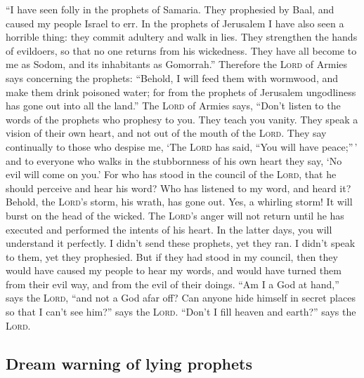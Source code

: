  ``I have seen folly in the prophets of Samaria. They
prophesied by Baal, and caused my people Israel to err. 
In the prophets of Jerusalem I have also seen a horrible thing: they
commit adultery and walk in lies. They strengthen the hands of
evildoers, so that no one returns from his wickedness. They have all
become to me as Sodom, and its inhabitants as Gomorrah.''
 Therefore the \textsc{Lord} of Armies says concerning
the prophets: ``Behold, I will feed them with wormwood, and make them
drink poisoned water; for from the prophets of Jerusalem ungodliness has
gone out into all the land.''  The \textsc{Lord} of
Armies says, ``Don't listen to the words of the prophets who prophesy to
you. They teach you vanity. They speak a vision of their own heart, and
not out of the mouth of the \textsc{Lord}.  They say
continually to those who despise me, `The \textsc{Lord} has said, ``You
will have peace;''\,' and to everyone who walks in the stubbornness of
his own heart they say, `No evil will come on you.'  For
who has stood in the council of the \textsc{Lord}, that he should
perceive and hear his word? Who has listened to my word, and heard it?
 Behold, the \textsc{Lord}'s storm, his wrath, has gone
out. Yes, a whirling storm! It will burst on the head of the wicked.
 The \textsc{Lord}'s anger will not return until he has
executed and performed the intents of his heart. In the latter days, you
will understand it perfectly.  I didn't send these
prophets, yet they ran. I didn't speak to them, yet they prophesied.
 But if they had stood in my council, then they would
have caused my people to hear my words, and would have turned them from
their evil way, and from the evil of their doings.  ``Am
I a God at hand,'' says the \textsc{Lord}, ``and not a God afar off?
 Can anyone hide himself in secret places so that I can't
see him?'' says the \textsc{Lord}. ``Don't I fill heaven and earth?''
says the \textsc{Lord}.

\hypertarget{dream-warning-of-lying-prophets}{%
\subsection{Dream warning of lying
prophets}\label{dream-warning-of-lying-prophets}}

